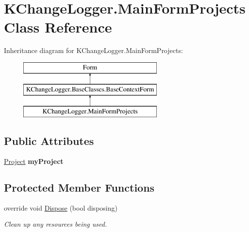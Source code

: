 \hypertarget{class_k_change_logger_1_1_main_form_projects}{\section{K\-Change\-Logger.\-Main\-Form\-Projects Class Reference}
\label{class_k_change_logger_1_1_main_form_projects}
}
Inheritance diagram for K\-Change\-Logger.\-Main\-Form\-Projects\-:\begin{figure}[H]
\begin{center}
\leavevmode
\includegraphics[height=3.000000cm]{class_k_change_logger_1_1_main_form_projects}
\end{center}
\end{figure}
\subsection*{Public Attributes}
\begin{DoxyCompactItemize}
\item 
\hypertarget{class_k_change_logger_1_1_main_form_projects_a47f329ca1c6a07ae17fa3f7a26aff687}{\hyperlink{class_k_change_logger_1_1_project}{Project} {\bfseries my\-Project}}\label{class_k_change_logger_1_1_main_form_projects_a47f329ca1c6a07ae17fa3f7a26aff687}

\end{DoxyCompactItemize}
\subsection*{Protected Member Functions}
\begin{DoxyCompactItemize}
\item 
override void \hyperlink{class_k_change_logger_1_1_main_form_projects_afa56d89303d71f06763ecc768b507172}{Dispose} (bool disposing)
\begin{DoxyCompactList}\small\item\em Clean up any resources being used. \end{DoxyCompactList}\end{DoxyCompactItemize}


